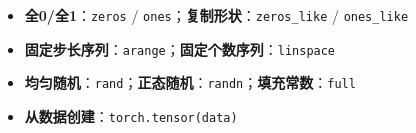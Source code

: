 \documentclass[a4paper,11pt]{ctexart}
\begin{document}
\begin{solutionbox}[参考答案与详细解析]
    \begin{keybox}[张量创建速查口诀]
        \begin{itemize}
            \item \textbf{全0/全1}：\texttt{zeros} / \texttt{ones}；\quad\textbf{复制形状}：\texttt{zeros\_like} / \texttt{ones\_like}
            \item \textbf{固定步长序列}：\texttt{arange}；\quad\textbf{固定个数序列}：\texttt{linspace}
            \item \textbf{均匀随机}：\texttt{rand}；\quad\textbf{正态随机}：\texttt{randn}；\quad\textbf{填充常数}：\texttt{full}
            \item \textbf{从数据创建}：\texttt{torch.tensor(data)}
        \end{itemize}
    \end{keybox}
\end{solutionbox}
\end{document}
